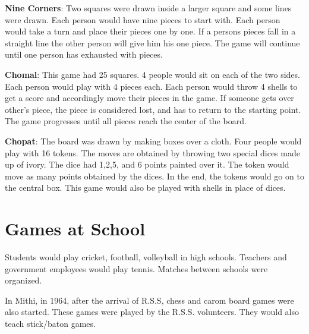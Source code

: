 \textbf{Nine Corners}: Two squares were drawn inside a larger square and some
lines were drawn. Each person would have nine pieces to start with.  Each
person would take a turn and place their pieces one by one. If a persons pieces
fall in a straight line the other person will give him his one piece. The game
will continue until one person has exhausted with pieces.

\textbf{Chomal}: This game had 25 squares. 4 people would sit on each of the
two sides. Each person would play with 4 pieces each. Each person would throw 4
shells to get a score and accordingly move their pieces in the game. If someone
gets over other's piece, the piece is considered lost, and has to return to the
starting point. The game progresses until all pieces reach the center of the
board.

\textbf{Chopat}: The board was drawn by making boxes over a cloth. Four people
would play with 16 tokens. The moves are obtained by throwing two special dices
made up of ivory. The dice had 1,2,5, and 6 points painted over it. The token
would move as many points obtained by the dices. In the end, the tokens would
go on to the central box. This game would also be played with shells in place
of dices.

\section{Games at School}

Students would play cricket, football, volleyball in high schools. Teachers
and government employees would play tennis. Matches between schools were
organized.

In Mithi, in 1964, after the arrival of R.S.S, chess and carom board games were
also started. These games were played by the R.S.S. volunteers. They would also
teach stick/baton games.

